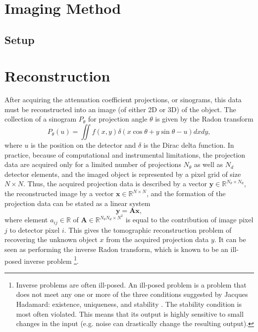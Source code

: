 \section{Imaging Method}
\subsection{Setup}

\section{Reconstruction}
After acquiring the attenuation coefficient projections, or sinograms, this data must be reconstructed into an image (of either 2D or 3D) of the object. The collection of a sinogram $P_\theta$ for projection angle $\theta$ is given by the Radon transform \cite{4307775,jimaging4110128}
\begin{equation}
    \label{eq:radontransform}
    P_\theta(u) = \iint f\left(x,y \right)\delta\left(x \cos \theta + y \sin \theta -u \right)dxdy,
\end{equation}
where $u$ is the position on the detector and $\delta$ is the Dirac delta function. In practice, because of computational and instrumental limitations, the projection data are acquired only for a limited number of projections $N_\theta$ as well as $N_d$ detector elements, and the imaged object is represented by a pixel grid of size $N \times N$. Thus, the acquired projection data is described by a vector $\bm{y} \in \mathbb{R}^{N_\theta \times N_d}$, the reconstructed image by a vector $\bm{x} \in \mathbb{R}^{N \times N}$, and the formation of the projection data can be stated as a linear system \cite{jimaging4110128}
\begin{equation}
    \label{eq:projectiondata}
    \bm{y} = \bm{A}\bm{x},
\end{equation}
where element $a_{ij} \in \mathbb{R}$ of $\bm{A} \in \mathbb{R}^{N_\theta N_d \times N^2}$ is equal to the contribution of image pixel $j$ to detector pixel $i$. This gives the tomographic reconstruction problem of recovering the unknown object $x$ from the acquired projection data $y$. It can be seen as performing the inverse Radon transform, which is known to be an ill-posed inverse problem \cite{KabanikhinIllVersed,GANrec}\footnote{Inverse problems are often ill-posed. An ill-posed problem is a problem that does not meet any one or more of the three conditions suggested by Jacques Hadamard: existence, uniqueness, and stability \cite{KabanikhinIllVersed}. The stability condition is most often violated. This means that its output is highly sensitive to small changes in the input (e.g. noise can drastically change the resulting output). }. 

